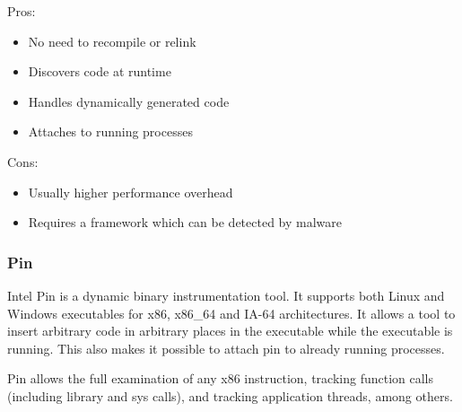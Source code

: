 \documentclass[11pt,a4paper,titlepage,dvipsnames,cmyk]{scrartcl}
\begin{document}
\begin{itemize}
    {\color{green}
    \item Pros:
    \begin{itemize}
        \item No need to recompile or relink
        \item Discovers code at runtime
        \item Handles dynamically generated code
        \item Attaches to running processes
    \end{itemize}
    }
    {\color{red}
    \item Cons:
    \begin{itemize}
        \item Usually higher performance overhead
        \item Requires a framework which can be detected by malware
    \end{itemize}
    }
\end{itemize}

\subsubsection{Pin}
Intel Pin is a dynamic binary instrumentation tool. It supports both Linux and Windows executables for x86, x86\_64 and IA-64 architectures. It allows a tool to insert arbitrary code in arbitrary places in the executable while the executable is running. This also makes it possible to attach pin to already running processes.

Pin allows the full examination of any x86 instruction, tracking function calls (including library and sys calls), and tracking application threads, among others.
\end{document}
